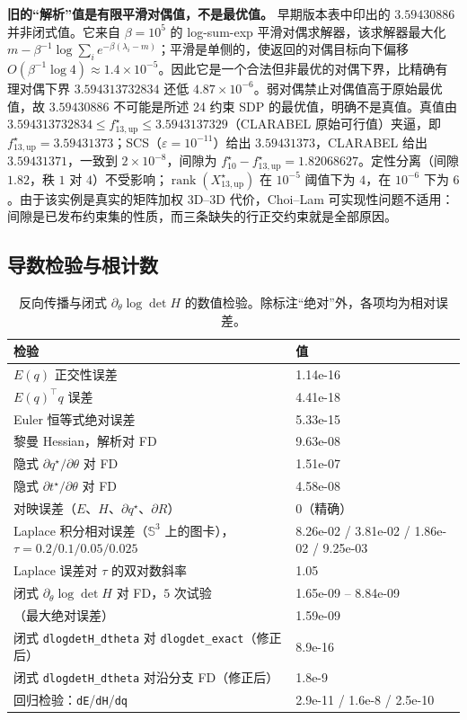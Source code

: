 \textbf{旧的“解析”值是有限平滑对偶值，不是最优值。} 早期版本表中印出的 $3.59430886$ 并非闭式值。它来自 $\beta=10^5$ 的 log-sum-exp 平滑对偶求解器，该求解器最大化 $m-\beta^{-1}\log\sum_i e^{-\beta(\lambda_i-m)}$；平滑是单侧的，使返回的对偶目标向下偏移 $O(\beta^{-1}\log4)\approx1.4\times10^{-5}$。因此它是一个合法但非最优的对偶下界，比精确有理对偶下界 $3.594313732834$ 还低 $4.87\times10^{-6}$。弱对偶禁止对偶值高于原始最优值，故 $3.59430886$ 不可能是所述 24 约束 SDP 的最优值，明确不是真值。真值由 $3.594313732834\le f^\star_{13,\mathrm{up}}\le3.5943137329$（CLARABEL 原始可行值）夹逼，即 $f^\star_{13,\mathrm{up}}=3.59431373$；SCS（$\varepsilon=10^{-11}$）给出 $3.59431373$，CLARABEL 给出 $3.59431371$，一致到 $2\times10^{-8}$，间隙为 $f^\star_{10}-f^\star_{13,\mathrm{up}}=1.82068627$。定性分离（间隙 $1.82$，秩 $1$ 对 $4$）不受影响；$\operatorname{rank}(X^\star_{13,\mathrm{up}})$ 在 $10^{-5}$ 阈值下为 $4$，在 $10^{-6}$ 下为 $6$。由于该实例是真实的矩阵加权 3D--3D 代价，Choi--Lam 可实现性问题不适用：间隙是已发布约束集的性质，而三条缺失的行正交约束就是全部原因。

\subsection{导数检验与根计数}\label{sec:rootcount}

\begin{table}[t]
\centering
\caption{反向传播与闭式 $\partial_\theta\log\det H$ 的数值检验。除标注“绝对”外，各项均为相对误差。}
\label{tab:backward}
\scriptsize
\setlength{\tabcolsep}{3pt}
\begin{tabular}{@{}p{3.85cm} p{3.9cm}@{}}
\toprule
检验 & 值\\
\midrule
$E(q)$ 正交性误差 & 1.14e-16\\
$E(q)^\top q$ 误差 & 4.41e-18\\
Euler 恒等式绝对误差 & 5.33e-15\\
黎曼 Hessian，解析对 FD & 9.63e-08\\
隐式 $\partial q^\star/\partial\theta$ 对 FD & 1.51e-07\\
隐式 $\partial t^\star/\partial\theta$ 对 FD & 4.58e-08\\
对映误差（$E$、$H$、$\partial q^\star$、$\partial R$） & 0（精确）\\
Laplace 积分相对误差（$\mathbb{S}^3$ 上的图卡），$\tau=0.2/0.1/0.05/0.025$ & 8.26e-02 / 3.81e-02 / 1.86e-02 / 9.25e-03\\
Laplace 误差对 $\tau$ 的双对数斜率 & 1.05\\
闭式 $\partial_\theta\log\det H$ 对 FD，$5$ 次试验 & 1.65e-09 -- 8.84e-09\\
\quad（最大绝对误差） & 1.59e-09\\
闭式 \texttt{dlogdetH\_dtheta} 对 \texttt{dlogdet\_exact}（修正后） & 8.9e-16\\
闭式 \texttt{dlogdetH\_dtheta} 对沿分支 FD（修正后） & 1.8e-9\\
回归检验：\texttt{dE}/\texttt{dH}/\texttt{dq} & 2.9e-11 / 1.6e-8 / 2.5e-10\\
\bottomrule
\end{tabular}
\end{table}

